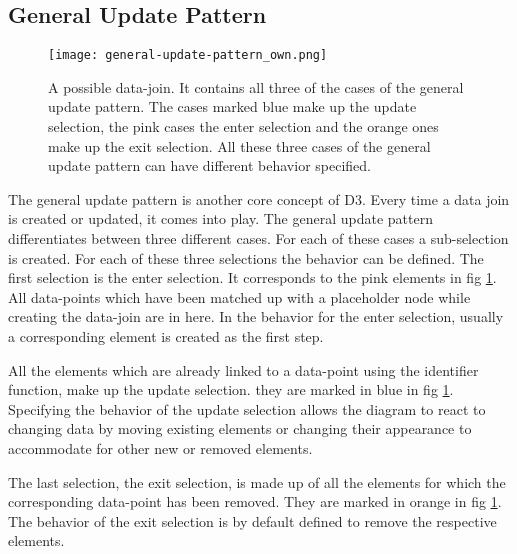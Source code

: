 \subsection{General Update Pattern}


\begin{figure}
    \texttt{[image: general-update-pattern\_own.png]}
    \caption[general-update-pattern]{A possible data-join. It contains all three of the cases of the general update pattern. The cases marked blue make up the update selection, the pink cases the enter selection and the orange ones make up the exit selection. All these three cases of the general update pattern can have different behavior specified.}
    \label{fig:general-update-pattern}
\end{figure}



The general update pattern is another core concept of D3. Every time a data join is created or updated, it comes into play. The general update pattern differentiates between three different cases. For each of these cases a sub-selection is created. For each of these three selections the behavior can be defined. The first selection is the enter selection. It corresponds to the pink elements in fig \ref{fig:general-update-pattern}. All data-points which have been matched up with a placeholder node while creating the data-join are in here. In the behavior for the enter selection, usually a corresponding element is created as the first step.

All the elements which are already linked to a data-point using the identifier function, make up the update selection. they are marked in blue in fig \ref{fig:general-update-pattern}. Specifying the behavior of the update selection allows the diagram to react to changing data by moving existing elements or changing their appearance to accommodate for other new or removed elements.

The last selection, the exit selection, is made up of all the elements for which the corresponding data-point has been removed. They are marked in orange in fig \ref{fig:general-update-pattern}. The behavior of the exit selection is by default defined to remove the respective elements.

